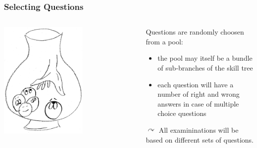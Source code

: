 \begin{frame}
 \frametitle{Selecting Questions}
 \begin{columns}
    \begin{column}{.5\textwidth}
       \centering
      \includegraphics[width=0.6\textwidth]{images/urn}
    \end{column}
    \begin{column}{.5\textwidth}
      Questions are randomly choosen from a pool:
      \begin{itemize}
        \item the pool may itself be a bundle of sub-branches of the skill tree
        \item each question will have a number of right and wrong answers in case of multiple choice questions
      \end{itemize}
      $\curvearrowright$ All examininations will be based on different sets of questions.
    \end{column}
  \end{columns}
\end{frame}

